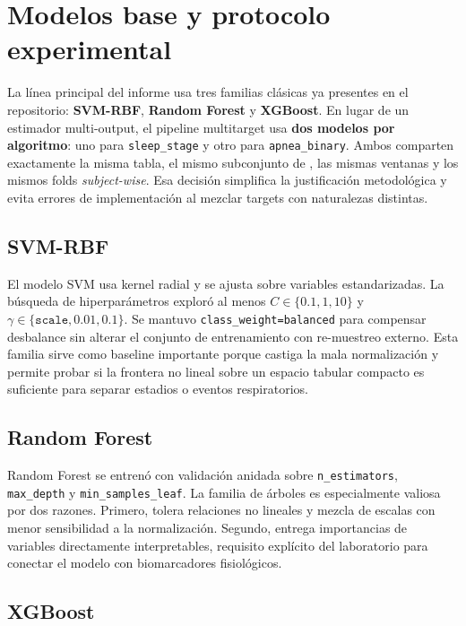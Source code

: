 \section{Modelos base y protocolo experimental}

La l\'inea principal del informe usa tres familias cl\'asicas ya presentes en el repositorio: \textbf{SVM-RBF}, \textbf{Random Forest} y \textbf{XGBoost}. En lugar de un estimador multi-output, el pipeline multitarget usa \textbf{dos modelos por algoritmo}: uno para \texttt{sleep\_stage} y otro para \texttt{apnea\_binary}. Ambos comparten exactamente la misma tabla, el mismo subconjunto de , las mismas ventanas y los mismos folds \emph{subject-wise}. Esa decisi\'on simplifica la justificaci\'on metodol\'ogica y evita errores de implementaci\'on al mezclar targets con naturalezas distintas.

\subsection{SVM-RBF}

El modelo SVM usa kernel radial y se ajusta sobre variables estandarizadas. La b\'usqueda de hiperpar\'ametros explor\'o al menos \(C \in \{0.1, 1, 10\}\) y \(\gamma \in \{\texttt{scale}, 0.01, 0.1\}\). Se mantuvo \texttt{class\_weight=balanced} para compensar desbalance sin alterar el conjunto de entrenamiento con re-muestreo externo. Esta familia sirve como baseline importante porque castiga la mala normalizaci\'on y permite probar si la frontera no lineal sobre un espacio tabular compacto es suficiente para separar estadios o eventos respiratorios.

\subsection{Random Forest}

Random Forest se entren\'o con validaci\'on anidada sobre \texttt{n\_estimators}, \texttt{max\_depth} y \texttt{min\_samples\_leaf}. La familia de \'arboles es especialmente valiosa por dos razones. Primero, tolera relaciones no lineales y mezcla de escalas con menor sensibilidad a la normalizaci\'on. Segundo, entrega importancias de variables directamente interpretables, requisito expl\'icito del laboratorio para conectar el modelo con biomarcadores fisiol\'ogicos.

\subsection{XGBoost}

